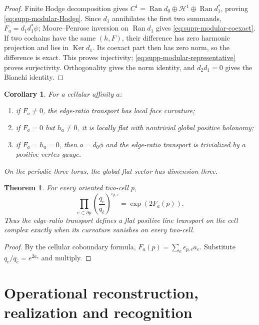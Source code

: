 \documentclass[11pt]{article}
\newtheorem{theorem}{Theorem}[section]
\newtheorem{corollary}[corollary]{Corollary}
\theoremstyle{definition}
\theoremstyle{remark}
\theoremstyle{definition}
\theoremstyle{remark}
\newcommand{\Ker}{\operatorname{Ker}}
\newcommand{\Ran}{\operatorname{Ran}}
\begin{document}
\begin{proof}
Finite Hodge decomposition gives
$C^1=\Ran d_0\oplus\mathscr H^1\oplus\Ran d_1^*$, proving
\eqref{eq:supp-modular-Hodge}.  Since $d_1$ annihilates the first two
summands, $F_a=d_1d_1^*\psi$; Moore--Penrose inversion on $\Ran d_1$ gives
\eqref{eq:supp-modular-coexact}.  If two cochains have the same $(h,F)$, their
difference has zero harmonic projection and lies in $\Ker d_1$.  Its coexact
part then has zero norm, so the difference is exact.  This proves injectivity;
\eqref{eq:supp-modular-representative} proves surjectivity.  Orthogonality
gives the norm identity, and $d_2d_1=0$ gives the Bianchi identity.
\end{proof}

\begin{corollary}
\label{cor:supp-modular-trichotomy}
For a cellular affinity $a$:
\begin{enumerate}[label=\textup{(M\arabic*)},leftmargin=3em]
\item if $F_a\ne0$, the edge-ratio transport has local face curvature;
\item if $F_a=0$ but $h_a\ne0$, it is locally flat with nontrivial global positive
      holonomy;
\item if $F_a=h_a=0$, then $a=d_0\phi$ and the edge-ratio transport is trivialized by a
      positive vertex gauge.
\end{enumerate}
On the periodic three-torus, the global flat sector has dimension three.
\end{corollary}

\begin{theorem}
\label{thm:supp-face-holonomy}
For every oriented two-cell $p$,
\begin{equation}
 {
 \prod_{e\subset\partial p}
 \left(\frac{q_e}{q_{\bar e}}\right)^{\epsilon_{p,e}}
 =\exp(2F_a(p)).}
 \label{eq:supp-face-holonomy}
\end{equation}
Thus the edge-ratio transport defines a flat positive line transport on the
cell complex exactly when its curvature vanishes on every two-cell.
\end{theorem}

\begin{proof}
By the cellular coboundary formula,
$F_a(p)=\sum_e\epsilon_{p,e}a_e$.  Substitute
$q_e/q_{\bar e}=e^{2a_e}$ and multiply.
\end{proof}

\section{Operational reconstruction, realization and recognition}
\label{app:operational-recognition}
\end{document}
